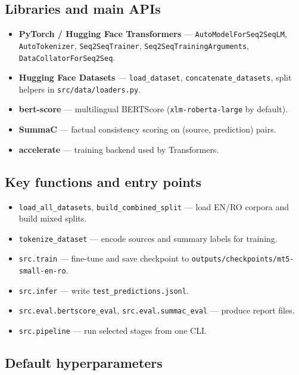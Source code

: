 \documentclass[11pt,a4paper]{article}
\begin{document}
\subsection{Libraries and main APIs}

\begin{itemize}
  \item \textbf{PyTorch / Hugging Face Transformers} --- \texttt{AutoModelForSeq2SeqLM}, \texttt{AutoTokenizer}, \texttt{Seq2SeqTrainer}, \texttt{Seq2SeqTrainingArguments}, \texttt{DataCollatorForSeq2Seq}.
  \item \textbf{Hugging Face Datasets} --- \texttt{load\_dataset}, \texttt{concatenate\_datasets}, split helpers in \texttt{src/data/loaders.py}.
  \item \textbf{bert-score} --- multilingual BERTScore (\texttt{xlm-roberta-large} by default).
  \item \textbf{SummaC} --- factual consistency scoring on (source, prediction) pairs.
  \item \textbf{accelerate} --- training backend used by Transformers.
\end{itemize}

\subsection{Key functions and entry points}

\begin{itemize}
  \item \texttt{load\_all\_datasets}, \texttt{build\_combined\_split} --- load EN/RO corpora and build mixed splits.
  \item \texttt{tokenize\_dataset} --- encode sources and summary labels for training.
  \item \texttt{src.train} --- fine-tune and save checkpoint to \texttt{outputs/checkpoints/mt5-small-en-ro}.
  \item \texttt{src.infer} --- write \texttt{test\_predictions.jsonl}.
  \item \texttt{src.eval.bertscore\_eval}, \texttt{src.eval.summac\_eval} --- produce report files.
  \item \texttt{src.pipeline} --- run selected stages from one CLI.
\end{itemize}

\subsection{Default hyperparameters}
\end{document}
